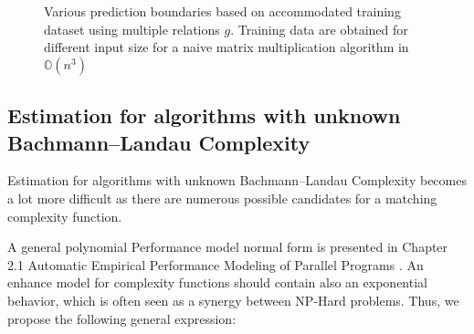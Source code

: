 \begin{figure}[H]
\caption{Various prediction boundaries based on accommodated training dataset using multiple relations $g$. Training data are obtained for different input size for a naive matrix multiplication algorithm in $\mathbb{O}(n^{3})$}
\end{figure}




\subsection{Estimation for algorithms with unknown Bachmann–Landau Complexity}
Estimation for algorithms with unknown Bachmann–Landau Complexity becomes a lot more difficult as there are numerous possible candidates for a matching complexity function. 

A general polynomial Performance model normal form is presented in Chapter 2.1 Automatic Empirical Performance Modeling of Parallel Programs \cite{calotoiu2018automatic}. An enhance model for complexity functions should contain also an exponential behavior, which is often seen as a synergy between NP-Hard problems. Thus, we propose the following general expression:

